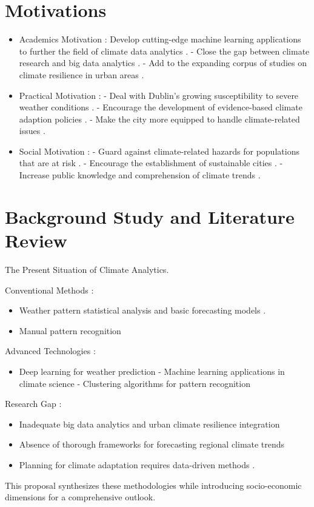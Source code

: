 \documentclass[a4paper]{report}
\begin{document}
\section*{Motivations}
\begin{itemize}
    \item Academics Motivation :
Develop cutting-edge machine learning applications to further the field of climate data analytics \cite{garcia2023}. 
- Close the gap between climate research and big data analytics \cite{evans2023}.
- Add to the expanding corpus of studies on climate resilience in urban areas \cite{harris2024}.
    \item Practical Motivation : - Deal with Dublin's growing susceptibility to severe weather conditions \cite{foster2024}.
    - Encourage the development of evidence-based climate adaption policies \cite{murphy2023}.
    - Make the city more equipped to handle climate-related issues \cite{rodriguez2023}.
    \item Social Motivation : - Guard against climate-related hazards for populations that are at risk \cite{smith2024}. 
    - Encourage the establishment of sustainable cities \cite{brown2024}. 
    - Increase public knowledge and comprehension of climate trends \cite{lee2023}.
\end{itemize}

\section*{Background Study and Literature Review}
The Present Situation of Climate Analytics.

Conventional Methods :
\begin{itemize}
    \item Weather pattern statistical analysis and basic forecasting models \cite{evans2023}.
    \item Manual pattern recognition \cite{lee2023}
\end{itemize}
 Advanced Technologies :
\begin{itemize}
    \item Deep learning for weather prediction \cite{wang2023} - Machine learning applications in climate science \cite{garcia2023} - Clustering algorithms for pattern recognition \cite{jackson2023}
\end{itemize}
 Research Gap  :
\begin{itemize}
    \item Inadequate big data analytics and urban climate resilience integration \cite{harris2024}
    \item Absence of thorough frameworks for forecasting regional climate trends \cite{foster2024}
    \item Planning for climate adaptation requires data-driven methods \cite{mitchell2024}.
\end{itemize}
This proposal synthesizes these methodologies while introducing socio-economic dimensions for a comprehensive outlook.
\end{document}
